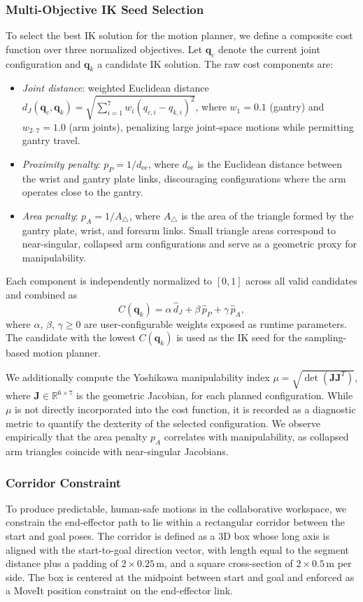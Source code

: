 \documentclass[letterpaper, 10 pt, conference]{ieeeconf}  %
\begin{document}
\subsubsection{Multi-Objective IK Seed Selection}
To select the best IK solution for the motion planner, we define a composite cost function over three normalized objectives. Let $\bm{q}_c$ denote the current joint configuration and $\bm{q}_k$ a candidate IK solution. The raw cost components are:
\begin{itemize}
\item \textit{Joint distance}: weighted Euclidean distance $d_J(\bm{q}_c, \bm{q}_k) = \sqrt{\sum_{i=1}^{7} w_i (q_{c,i} - q_{k,i})^2}$, where $w_1 = 0.1$ (gantry) and $w_{2\text{--}7} = 1.0$ (arm joints), penalizing large joint-space motions while permitting gantry travel.
\item \textit{Proximity penalty}: $p_P = 1/d_{\text{ee}}$, where $d_{\text{ee}}$ is the Euclidean distance between the wrist and gantry plate links, discouraging configurations where the arm operates close to the gantry.
\item \textit{Area penalty}: $p_A = 1/A_\triangle$, where $A_\triangle$ is the area of the triangle formed by the gantry plate, wrist, and forearm links. Small triangle areas correspond to near-singular, collapsed arm configurations and serve as a geometric proxy for manipulability.
\end{itemize}
Each component is independently normalized to $[0,1]$ across all valid candidates and combined as
$$
C(\bm{q}_k) = \alpha \,\hat{d}_J + \beta \,\hat{p}_P + \gamma \,\hat{p}_A,
$$
where $\alpha$, $\beta$, $\gamma \geq 0$ are user-configurable weights exposed as runtime parameters. The candidate with the lowest $C(\bm{q}_k)$ is used as the IK seed for the sampling-based motion planner.

We additionally compute the Yoshikawa manipulability index \cite{yoshikawa1985manipulability} $\mu = \sqrt{\det(\bm{J}\bm{J}^T)}$, where $\bm{J} \in \mathbb{R}^{6 \times 7}$ is the geometric Jacobian, for each planned configuration. While $\mu$ is not directly incorporated into the cost function, it is recorded as a diagnostic metric to quantify the dexterity of the selected configuration. We observe empirically that the area penalty $p_A$ correlates with manipulability, as collapsed arm triangles coincide with near-singular Jacobians.

\subsubsection{Corridor Constraint}
To produce predictable, human-safe motions in the collaborative workspace, we constrain the end-effector path to lie within a rectangular corridor between the start and goal poses. The corridor is defined as a 3D box whose long axis is aligned with the start-to-goal direction vector, with length equal to the segment distance plus a padding of $2 \times 0.25$\,m, and a square cross-section of $2 \times 0.5$\,m per side. The box is centered at the midpoint between start and goal and enforced as a MoveIt position constraint on the end-effector link.
\end{document}
